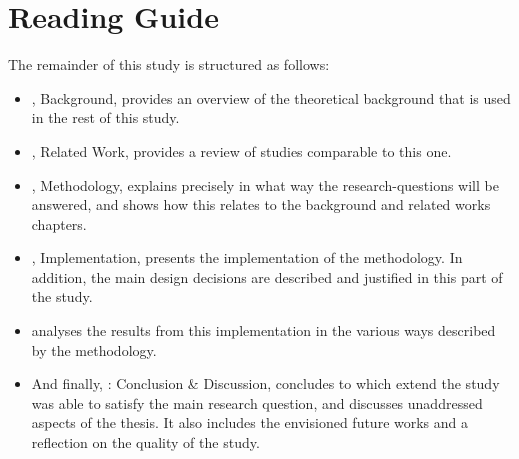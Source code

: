 \newpage
\section{Reading Guide}
The remainder of this study is structured as follows:

\begin{itemize}[ ]
  \item {}, Background, provides an overview of the theoretical background that is used in the rest of this study.
  
  \item {}, Related Work, provides a review of studies comparable to this one.

  \item {}, Methodology, explains precisely in what way the research-questions will be answered, and shows how this relates to the background and related works chapters. 

  \item {}, Implementation, presents the implementation of the methodology.
  In addition, the main design decisions are described and justified in this part of the study.
  
  \item {} analyses the results from this implementation in the various ways described by the methodology.
  
  \item And finally, : Conclusion \& Discussion, concludes to which extend the study was able to satisfy the main research question, and discusses unaddressed aspects of the thesis.
  It also includes the envisioned future works and a reflection on the quality of the study.

\end{itemize}